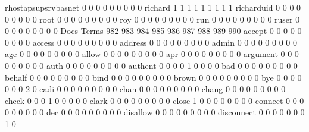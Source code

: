 \documentclass[compress,8pt]{beamer}
\begin{document}
\begin{frame}
\begin{Schunk}
  rhostapsupsrvbasnet                        0   0   0   0   0   0   0   0   0
  richard                                    1   1   1   1   1   1   1   1   1
  richarduid                                 0   0   0   0   0   0   0   0   0
  root                                       0   0   0   0   0   0   0   0   0
  roy                                        0   0   0   0   0   0   0   0   0
  run                                        0   0   0   0   0   0   0   0   0
  ruser                                      0   0   0   0   0   0   0   0   0
                                          Docs
Terms                                      982 983 984 985 986 987 988 989 990
  accept                                     0   0   0   0   0   0   0   0   0
  access                                     0   0   0   0   0   0   0   0   0
  address                                    0   0   0   0   0   0   0   0   0
  admin                                      0   0   0   0   0   0   0   0   0
  age                                        0   0   0   0   0   0   0   0   0
  allow                                      0   0   0   0   0   0   0   0   0
  apr                                        0   0   0   0   0   0   0   0   0
  argument                                   0   0   0   0   0   0   0   0   0
  auth                                       0   0   0   0   0   0   0   0   0
  authent                                    0   0   0   0   1   0   0   0   0
  bad                                        0   0   0   0   0   0   0   0   0
  behalf                                     0   0   0   0   0   0   0   0   0
  bind                                       0   0   0   0   0   0   0   0   0
  brown                                      0   0   0   0   0   0   0   0   0
  bye                                        0   0   0   0   0   0   0   2   0
  cadi                                       0   0   0   0   0   0   0   0   0
  chan                                       0   0   0   0   0   0   0   0   0
  chang                                      0   0   0   0   0   0   0   0   0
  check                                      0   0   0   1   0   0   0   0   0
  clark                                      0   0   0   0   0   0   0   0   0
  close                                      1   0   0   0   0   0   0   0   0
  connect                                    0   0   0   0   0   0   0   0   0
  dec                                        0   0   0   0   0   0   0   0   0
  disallow                                   0   0   0   0   0   0   0   0   0
  disconnect                                 0   0   0   0   0   0   0   1   0

\end{Schunk}
\end{frame}
\end{document}

